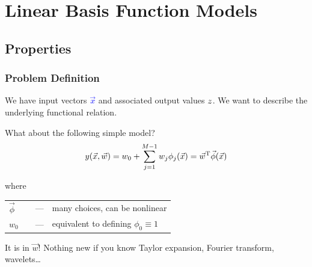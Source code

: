 \documentclass[USenglish,pdftex,compress,10pt,svgnamesi,handout]{beamer}
\begin{document}
\section[LBF Models]{Linear Basis Function Models}
\subsection{Properties}
\begin{frame}
	\frametitle{Problem Definition}
	
	We have input vectors \textcolor{blue}{$\Vec{x}$} and associated
    output values \textcolor{blue}{$z$}. We want to describe the underlying
    functional relation.
	\bigskip
\pause

What about the following simple model?
\begin{equation}
	y(\Vec{x},\Vec{w}) = w_0 + \sum_{j=1}^{M-1}w_j\phi_j(\Vec{x}) = \Vec{w}^{\text{T}}\Vec{\phi}(\Vec{x})
\end{equation}

where

\begin{tabular}[t]{llcl}
	$\Vec{\phi}$ & \Def{basis function} &---&  many choices, can be nonlinear\\
	$w_0$ & \Def{bias} &---& equivalent to defining $\phi_0 \equiv 1$ \\
\end{tabular}\medskip
\pause

It is  in $\Vec{w}$! Nothing new if you know 
Taylor expansion, Fourier transform, wavelets\dots

\end{frame}
\end{document}
